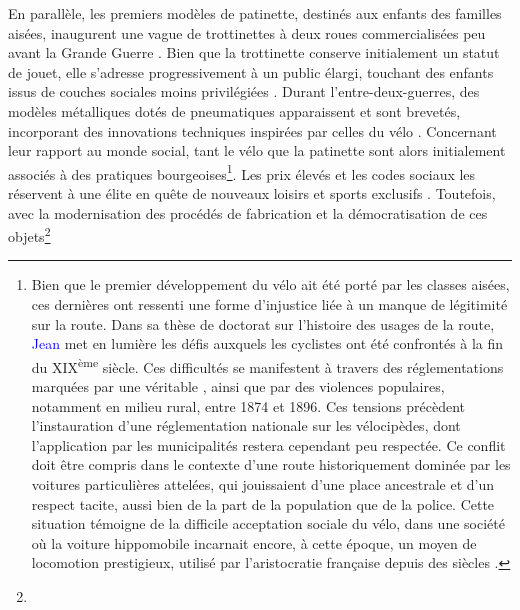 \begin{refsegment}
En parallèle, les premiers modèles de patinette, destinés aux enfants des familles aisées, inaugurent une vague de trottinettes à deux roues commercialisées peu avant la Grande Guerre \textcolor{blue}{\autocite{jeux_et_compagnie_histoire_2013}}. Bien que la trottinette conserve initialement un statut de jouet, elle s’adresse progressivement à un public élargi, touchant des enfants issus de couches sociales moins privilégiées \textcolor{blue}{\autocite{historia_trottinette_2013}}. Durant l’entre-deux-guerres, des modèles métalliques dotés de pneumatiques apparaissent et sont brevetés, incorporant des innovations techniques inspirées par celles du vélo \textcolor{blue}{\autocite{arte_histoire_2014}}. Concernant leur rapport au monde social, tant le vélo que la patinette sont alors initialement associés à des pratiques bourgeoises\footnote{
    Bien que le premier développement du vélo ait été porté par les classes aisées, ces dernières ont ressenti une forme d’injustice liée à un manque de légitimité sur la route. Dans sa thèse de doctorat sur l’histoire des usages de la route, \textcolor{blue}{Jean} \textcolor{blue}{\textcite[126-132, 327]{orselli_usages_2008}} met en lumière les défis auxquels les cyclistes ont été confrontés à la fin du XIX\textsuperscript{ème} siècle. Ces difficultés se manifestent à travers des réglementations marquées par une véritable , ainsi que par des violences populaires, notamment en milieu rural, entre 1874 et 1896. Ces tensions précèdent l’instauration d’une réglementation nationale sur les vélocipèdes, dont l’application par les municipalités restera cependant peu respectée. Ce conflit doit être compris dans le contexte d’une route historiquement dominée par les voitures particulières attelées, qui jouissaient d’une place ancestrale et d’un respect tacite, aussi bien de la part de la population que de la police. Cette situation témoigne de la difficile acceptation sociale du vélo, dans une société où la voiture hippomobile incarnait encore, à cette époque, un moyen de locomotion prestigieux, utilisé par l’aristocratie française depuis des siècles \textcolor{blue}{\autocite[139]{orselli_usages_2008}}.
}. Les prix élevés et les codes sociaux les réservent à une élite en quête de nouveaux loisirs et sports exclusifs \textcolor{blue}{\autocite[90]{bravard_cercle_2011}}. Toutefois, avec la modernisation des procédés de fabrication et la démocratisation de ces objets\footnote{
}
\end{refsegment}
